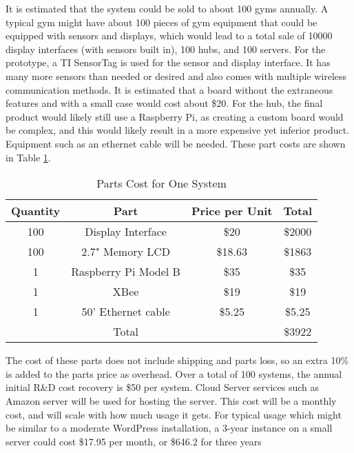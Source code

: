 \documentclass[PPFS.tex]{template/subfiles}
\begin{document}
        It is estimated that the system could be sold to about 100 gyms annually. A typical gym might have about 100 pieces of gym equipment that could be equipped with sensors and displays, which would lead to a total sale of 10000 display interfaces (with sensors built in), 100 hubs, and 100 servers. 
        For the prototype, a TI SensorTag is used for the sensor and display interface. It has many more sensors than needed or desired and also comes with multiple wireless communication methods. It is estimated that a board without the extraneous features and with a small case would cost about \$20.
        For the hub, the final product would likely still use a Raspberry Pi, as creating a custom board would be complex, and this would likely result in a more expensive yet inferior product. Equipment such as an ethernet cable will be needed.
        These part costs are shown in Table \ref{tab:prodPartsCost}.
        
        \begin{table}[H]
        	\begin{center}
        		\caption{Parts Cost for One System}
        		\label{tab:prodPartsCost}
        		\begin{tabular}{|c|c|c|c|}
        			\hline
        			Quantity & Part & Price per Unit & Total\\
        			\hline
        			100 & Display Interface & \$20 & \$2000\\
        			\hline
        			100 & 2.7" Memory LCD & \$18.63 \cite{mouserMemoryLCD} & \$1863\\
        			\hline
        			1 & Raspberry Pi Model B & \$35 \cite{alliedRaspberryPi} & \$35\\
        			\hline
        			1 & XBee & \$19 \cite{mouserXBEE} & \$19\\
        			\hline
        			1 & 50' Ethernet cable & \$5.25 \cite{amazonEthernetCable} & \$5.25\\
        			\hline
        			&Total&& \$3922\\
        			\hline
        		\end{tabular}
        	\end{center}
        \end{table}
        
        The cost of these parts does not include shipping and parts loss, so an extra 10\% is added to the parts price as overhead. 
        Over a total of 100 systems, the annual initial R\&D cost recovery is \$50 per system.
        Cloud Server services such as Amazon server will be used for hosting the server. This cost will be a monthly cost, and will scale with how much usage it gets. For typical usage which might be similar to a moderate WordPress installation, a 3-year instance on a small server could cost \$17.95 per month, or \$646.2 for three years \cite{wordPressEstimate}
        
\end{document}

